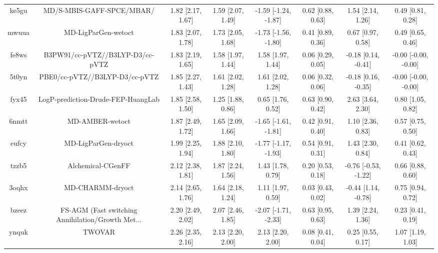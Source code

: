\documentclass{article}
\begin{document}
\begin{center}
\begin{longtable}{|cccccccc|}
 ke5gu &                          MD/S-MBIS-GAFF-SPCE/MBAR/ &  1.82 [2.17, 1.67] &  1.59 [2.07, 1.49] &  -1.59 [-1.24, -1.87] &  0.62 [0.88, 0.63] &     1.54 [2.14, 1.26] &     0.49 [0.81, 0.28] \\
 mwuua &                                MD-LigParGen-wetoct &  1.83 [2.07, 1.78] &  1.73 [2.05, 1.68] &  -1.73 [-1.56, -1.80] &  0.41 [0.89, 0.36] &     0.67 [0.97, 0.58] &     0.49 [0.65, 0.46] \\
 fe8ws &                   B3PW91/cc-pVTZ//B3LYP-D3/cc-pVTZ &  1.83 [2.19, 1.65] &  1.58 [1.97, 1.44] &     1.58 [1.97, 1.44] &  0.06 [0.29, 0.05] &   -0.18 [0.14, -0.41] &  -0.00 [-0.00, -0.00] \\
 5t0yn &                     PBE0/cc-pVTZ//B3LYP-D3/cc-pVTZ &  1.85 [2.27, 1.43] &  1.61 [2.02, 1.28] &     1.61 [2.02, 1.28] &  0.06 [0.32, 0.06] &   -0.18 [0.16, -0.35] &  -0.00 [-0.00, -0.00] \\
 fyx45 &                 LogP-prediction-Drude-FEP-HuangLab &  1.85 [2.58, 1.50] &  1.25 [1.88, 0.86] &     0.65 [1.76, 0.52] &  0.63 [0.90, 0.42] &     2.63 [3.64, 2.30] &     0.80 [1.05, 0.82] \\
 6nmtt &                                    MD-AMBER-wetoct &  1.87 [2.49, 1.72] &  1.65 [2.09, 1.66] &  -1.65 [-1.61, -1.81] &  0.42 [0.91, 0.40] &     1.10 [2.36, 0.83] &     0.57 [0.75, 0.50] \\
 eufcy &                                MD-LigParGen-dryoct &  1.99 [2.25, 1.94] &  1.88 [2.10, 1.80] &  -1.77 [-1.17, -1.93] &  0.54 [0.91, 0.31] &     1.43 [2.30, 0.84] &     0.41 [0.62, 0.43] \\
 tzzb5 &                                  Alchemical-CGenFF &  2.12 [2.38, 1.81] &  1.87 [2.24, 1.56] &     1.43 [1.78, 0.79] &  0.20 [0.53, 0.18] &  -0.76 [-0.53, -1.22] &     0.66 [0.88, 0.60] \\
 3oqhx &                                   MD-CHARMM-dryoct &  2.14 [2.65, 1.76] &  1.64 [2.18, 1.24] &     1.11 [1.97, 0.59] &  0.03 [0.43, 0.02] &   -0.44 [1.14, -0.78] &     0.75 [0.94, 0.72] \\
 bzeez &  FS-AGM (Fast switching Annihilation/Growth Met... &  2.20 [2.49, 2.02] &  2.07 [2.46, 1.85] &  -2.07 [-1.71, -2.33] &  0.63 [0.95, 0.63] &     1.39 [2.24, 1.36] &     0.23 [0.41, 0.19] \\
 ynquk &                                             TWOVAR &  2.26 [2.35, 2.16] &  2.13 [2.20, 2.00] &     2.13 [2.20, 2.00] &  0.08 [0.41, 0.04] &     0.25 [0.55, 0.17] &     1.07 [1.19, 1.03] \\

\end{longtable}
\end{center}
\end{document}
